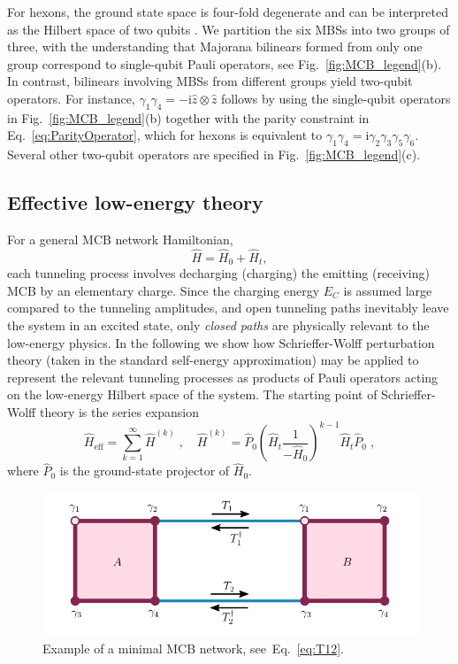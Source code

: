 \documentclass[twocolumn,floats,prx,showpacs]{revtex4-1}
\begin{document}
For hexons, the ground state space is four-fold degenerate and can be interpreted as the Hilbert space of two qubits \cite{Karzig2017}. We partition the six MBSs into two groups of three, with the understanding that Majorana bilinears formed from only one group correspond to single-qubit Pauli operators,
see Fig.~\ref{fig:MCB_legend}(b).  In contrast, bilinears involving MBSs from different groups  
yield two-qubit operators. For instance, $\gamma_1 \gamma_4 = - \mathrm i \hat z \otimes \hat z$ 
follows by using the single-qubit operators in Fig.~\ref{fig:MCB_legend}(b) together with the 
parity constraint in Eq.~\eqref{eq:ParityOperator}, which for hexons is equivalent to $\gamma_1 \gamma_4 = \mathrm i \gamma_2 \gamma_3 \gamma_5 \gamma_6$. Several other two-qubit operators are specified in Fig.~\ref{fig:MCB_legend}(c). 

\subsection{Effective low-energy theory}\label{sec2d}

For a general MCB network Hamiltonian, 
\begin{equation}
\hat H=\hat H_0+\hat H_t,
\end{equation}
each tunneling process involves decharging (charging) the emitting (receiving) MCB by an elementary charge. Since the charging energy $E_C$ is assumed large compared to the tunneling amplitudes, and open tunneling paths inevitably leave the system in an excited state, only  
\emph{closed paths} are physically relevant to the low-energy physics. In the following we show how Schrieffer-Wolff perturbation theory (taken in the standard self-energy approximation) \cite{Bravyi2011} may be applied to represent the relevant tunneling processes as products of Pauli operators acting on the low-energy Hilbert space of the system. 
The starting point of Schrieffer-Wolff theory is the series expansion
\begin{equation}\label{eq:series} 
\hat H_\text{eff}=\sum_{k=1}^\infty\hat H^{(k)}\;,\quad
\hat H^{(k)}=\hat P_0 \left(\hat H_t \frac{1}{-\hat H_0} \right)^{k-1} \hat H_t \hat P_0 \;,
\end{equation}
where $\hat P_0$ is the ground-state projector of $\hat H_0$.

\begin{figure}%
\includegraphics[width=\columnwidth]{fig/example.pdf}%
\caption{Example of a minimal MCB network, see~Eq.~\eqref{eq:T12}.} %
\label{fig:example}%
\end{figure}
\end{document}

